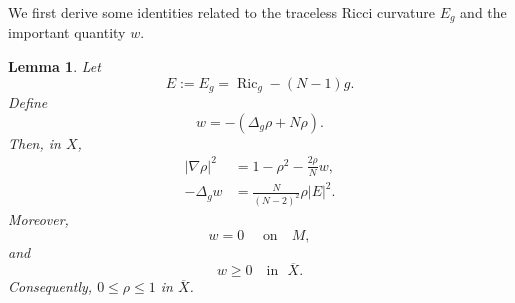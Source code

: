 \documentclass[11pt,letterpaper]{amsart}
\newtheorem{lemma}[theorem]{Lemma}
\theoremstyle{definition}
\theoremstyle{remark}
\numberwithin{equation}{section}
\newcommand{\Ric}{\operatorname{Ric}}
\newcommand{\barX}{\overline X}
\begin{document}
We first derive some identities related to the traceless Ricci curvature $E_g$ and the important quantity $w$.
\begin{lemma}\label{lem:CE-identities}
Let \begin{equation}\label{eq:E-def}
 E:=E_g=\Ric_g-(N-1)g.
\end{equation}
Define
\begin{equation}\label{eq:w-equations}
 w=-\left(\Delta_g\rho+N\rho\right).
\end{equation}
Then, in $X$,
\begin{align}
        |\nabla\rho|^2
        &=1-\rho^2-\frac{2\rho}{N}w,\label{eq:grad-rho}\\
        -\Delta_g w
        & =\frac{N}{(N-2)^2}\rho |E|^2.\label{eq:Delta-U}
\end{align}
Moreover, 
\[
w=0 \quad \text{ on~~ } M,
\]
and 
\begin{equation}\label{eq:w-positive}
        w\ge0 \quad \text{in~~} \barX.
\end{equation}
Consequently, $0\le \rho\le1$ in $\barX$.
\end{lemma}
\end{document}
